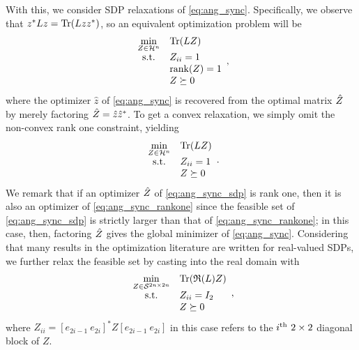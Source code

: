 With this, we consider SDP relaxations of \eqref{eq:ang_sync}.  Specifically, we observe that $z^* L z = \operatorname{Tr}(L z z^*)$, so an equivalent optimization problem will be
\begin{equation}
  \begin{array}{cl}
    \min\limits_{Z \in \mathcal{H}^n} & \operatorname{Tr}(L Z) \\
    \text{s.t.} & Z_{ii} = 1 \\
    & \operatorname{rank}(Z) = 1 \\
    & Z \succeq 0
  \end{array}, \label{eq:ang_sync_rankone}
\end{equation}
where the optimizer $\hat{z}$ of \eqref{eq:ang_sync} is recovered from the optimal matrix $\hat{Z}$ by merely factoring $\hat{Z} = \hat{z} \hat{z}^*$.  To get a convex relaxation, we simply omit the non-convex rank one constraint, yielding \begin{equation} \begin{array}{cl} \min\limits_{Z \in \mathcal{H}^n} & \operatorname{Tr}(L Z) \\ \text{s.t.} & Z_{ii} = 1 \\ & Z \succeq 0 \end{array}. \label{eq:ang_sync_sdp} \end{equation}  We remark that if an optimizer $\hat{Z}$ of \eqref{eq:ang_sync_sdp} is rank one, then it is also an optimizer of \eqref{eq:ang_sync_rankone} since the feasible set of \eqref{eq:ang_sync_sdp} is strictly larger than that of \eqref{eq:ang_sync_rankone}; in this case, then, factoring $\hat{Z}$ gives the global minimizer of \eqref{eq:ang_sync}.  Considering that many results in the optimization literature are written for real-valued SDPs, we further relax the feasible set by casting into the real domain with
\begin{equation}
  \begin{array}{cl}
    \min\limits_{Z \in \mathcal{S}^{2n \times 2n}} & \operatorname{Tr}(\mathfrak{R}(L) Z) \\
    \text{s.t.} & Z_{ii} = I_2 \\
    & Z \succeq 0
  \end{array}, \label{eq:ang_sync_real}
\end{equation}
where $Z_{ii} = [e_{2i - 1} \ e_{2i}]^* Z [e_{2i - 1} \ e_{2i}]$ in this case refers to the $i^{\text{th}} \ 2 \times 2$ diagonal block of $Z$.


